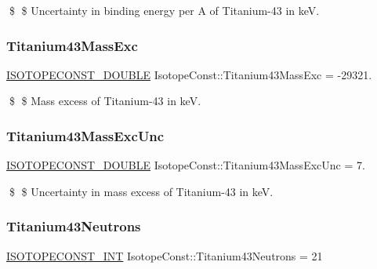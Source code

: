 \$ \$ Uncertainty in binding energy per A of Titanium-\/43 in keV. \mbox{\label{group___isotope_const-_titanium-_ti43_gabaf6e3f078e3419edc2eb802995b0c6d}} 
\subsubsection{\texorpdfstring{Titanium43\+Mass\+Exc}{Titanium43MassExc}}
{\footnotesize\ttfamily \mbox{\hyperlink{group___isotope_const-_macros_ga8f45a7272ce02c0b4c65c44636ed719a}{I\+S\+O\+T\+O\+P\+E\+C\+O\+N\+S\+T\+\_\+\+D\+O\+U\+B\+LE}} Isotope\+Const\+::\+Titanium43\+Mass\+Exc = -\/29321.}

\$ \$ Mass excess of Titanium-\/43 in keV. \mbox{\label{group___isotope_const-_titanium-_ti43_ga6ae34cc8dd57c8aa9d248427a56d3daa}} 
\subsubsection{\texorpdfstring{Titanium43\+Mass\+Exc\+Unc}{Titanium43MassExcUnc}}
{\footnotesize\ttfamily \mbox{\hyperlink{group___isotope_const-_macros_ga8f45a7272ce02c0b4c65c44636ed719a}{I\+S\+O\+T\+O\+P\+E\+C\+O\+N\+S\+T\+\_\+\+D\+O\+U\+B\+LE}} Isotope\+Const\+::\+Titanium43\+Mass\+Exc\+Unc = 7.}

\$ \$ Uncertainty in mass excess of Titanium-\/43 in keV. \mbox{\label{group___isotope_const-_titanium-_ti43_ga91df927c56abd72364ba5c3fc37be4a6}} 
\subsubsection{\texorpdfstring{Titanium43\+Neutrons}{Titanium43Neutrons}}
{\footnotesize\ttfamily \mbox{\hyperlink{group___isotope_const-_macros_ga5f18360b3e99483a35c32d789e62621c}{I\+S\+O\+T\+O\+P\+E\+C\+O\+N\+S\+T\+\_\+\+I\+NT}} Isotope\+Const\+::\+Titanium43\+Neutrons = 21}

